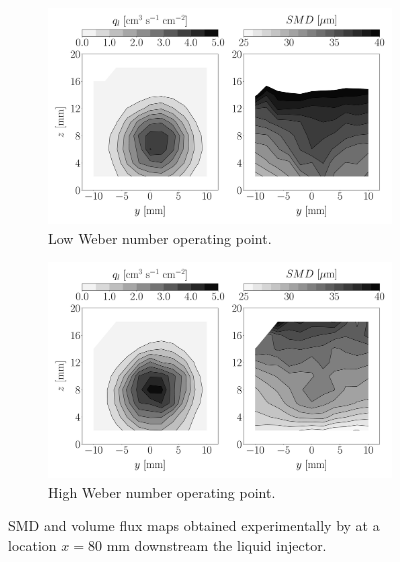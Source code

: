 \begin{figure}[h!]
\flushleft
\begin{subfigure}[b]{0.45\textwidth}
	\flushleft
   \includegraphics[scale=0.185]{./part2_developments/figures_ch6_lagrangian_JICF/expe_results/maps_UG75}
   \caption{Low Weber number operating point.}
\end{subfigure}
\hspace{0.3in}
\begin{subfigure}[b]{0.45\textwidth}
	\centering
   \includegraphics[scale=0.19]{./part2_developments/figures_ch6_lagrangian_JICF/expe_results/maps_UG100}
   \caption{High Weber number operating point.}
\end{subfigure}
\caption{SMD and volume flux maps obtained experimentally by  at a location $x = 80$ mm downstream the liquid injector.}
\label{fig:maps_Becker_expe_results}
\end{figure}

